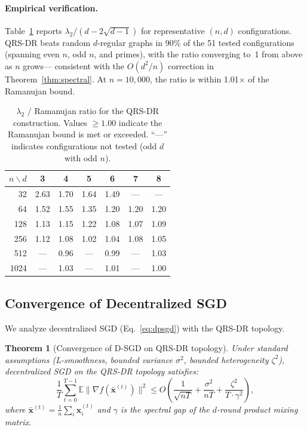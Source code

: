 \documentclass{article}
\newtheorem{theorem}{Theorem}
\newcommand{\E}{\mathbb{E}}
\newcommand{\bx}{\mathbf{x}}
\newcommand{\lam}{\lambda_2}
\begin{document}
\paragraph{Empirical verification.}
Table~\ref{tab:spectral} reports $\lam / (d - 2\sqrt{d-1})$ for
representative $(n, d)$ configurations.  QRS-DR beats random $d$-regular
graphs in 90\% of the 51 tested configurations (spanning even $n$, odd $n$,
and primes), with the ratio converging to~1 from above as $n$ grows---
consistent with the $O(d^2/n)$ correction in Theorem~\ref{thm:spectral}.
At $n = 10{,}000$, the ratio is within 1.01$\times$ of the Ramanujan bound.

\begin{table}[h]
\caption{$\lam$ / Ramanujan ratio for the QRS-DR construction.
Values $\ge 1.00$ indicate the Ramanujan bound is met or exceeded.
``---'' indicates configurations not tested (odd $d$ with odd $n$).}
\label{tab:spectral}
\centering
\small
\begin{tabular}{r|cccccc}
\toprule
$n \backslash d$ & 3 & 4 & 5 & 6 & 7 & 8 \\
\midrule
32   & 2.63 & 1.70 & 1.64 & 1.49 & ---  & ---  \\
64   & 1.52 & 1.55 & 1.35 & 1.20 & 1.20 & 1.20 \\
128  & 1.13 & 1.15 & 1.22 & 1.08 & 1.07 & 1.09 \\
256  & 1.12 & 1.08 & 1.02 & 1.04 & 1.08 & 1.05 \\
512  & ---  & 0.96 & ---  & 0.99 & ---  & 1.03 \\
1024 & ---  & 1.03 & ---  & 1.01 & ---  & 1.00 \\
\bottomrule
\end{tabular}
\end{table}


\subsection{Convergence of Decentralized SGD}
\label{sec:convergence}

We analyze decentralized SGD (Eq.~\ref{eq:dpsgd}) with the QRS-DR
topology.

\begin{theorem}[Convergence of D-SGD on QRS-DR topology]
\label{thm:convergence}
Under standard assumptions (L-smoothness, bounded variance $\sigma^2$,
bounded heterogeneity $\zeta^2$), decentralized SGD on the QRS-DR topology satisfies:
\[
\frac{1}{T} \sum_{t=0}^{T-1} \E\|\nabla f(\bar{\bx}^{(t)})\|^2
\le O\!\left(\frac{1}{\sqrt{nT}} + \frac{\sigma^2}{nT}
    + \frac{\zeta^2}{T \cdot \gamma^2}\right),
\]
where $\bar{\bx}^{(t)} = \frac{1}{n}\sum_i \bx_i^{(t)}$ and
$\gamma$ is the spectral gap of the $d$-round product mixing matrix.
\end{theorem}
\end{document}
